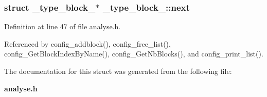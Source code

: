 \subsubsection{\setlength{\rightskip}{0pt plus 5cm}struct {\bf \_\-type\_\-block\_\-}$\ast$ {\bf \_\-type\_\-block\_\-::next}}\label{struct__type__block___o2}




Definition at line 47 of file analyse.h.

Referenced by config\_\-addblock(), config\_\-free\_\-list(), config\_\-Get\-Block\-Index\-By\-Name(), config\_\-Get\-Nb\-Blocks(), and config\_\-print\_\-list().

The documentation for this struct was generated from the following file:\begin{CompactItemize}
\item 
{\bf analyse.h}\end{CompactItemize}
